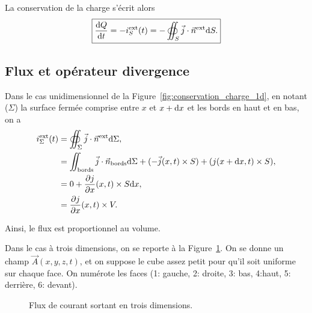         La conservation de la charge s'écrit alors
        \begin{equation}
            \boxed{
                \frac{\mathrm{d} Q}{\mathrm{d} t}=-i_{S}^{\text{ext}}(t)=-\oiint_{S}\vec{j}\cdot\vec{n}^{\text{ext}}\mathrm{d} S.
            }
        \end{equation}

    \subsection{Flux et opérateur \og divergence\fg}

        Dans le cas unidimensionnel de la Figure~\ref{fig:conservation_charge_1d}, en notant ($\Sigma$) la surface fermée comprise entre $x$ et $x+\mathrm{d} x$ et les bords en haut et en bas, on a 
        \begin{align}
            i_{\Sigma}^{\text{ext}}(t)
            &=
            \oiint_{\Sigma}\vec{j}\cdot\vec{n}^{\text{ext}}\mathrm{d}\Sigma,\\
            &=
            \iint_{\text{bords}}\vec{j}\cdot\vec{n}_{\text{bords}}\mathrm{d}\Sigma+(-\vec{j}(x,t)\times S)+(j(x+\mathrm{d} x,t)\times S),\\
            &= 0 +\frac{\partial j}{\partial x}(x,t)\times S\mathrm{d} x,\\
            &=\frac{\partial j}{\partial x}(x,t) \times V.
        \end{align}

        Ainsi, le flux est proportionnel au volume.

        Dans le cas à trois dimensions, on se reporte à la Figure~\ref{fig:flux_operateur_divergence_trois_dimensions}. On se donne un champ $\vec{A}(x,y,z,t)$, et on suppose le cube assez petit pour qu'il soit uniforme sur chaque face. On numérote les faces (1: gauche, 2: droite, 3: bas, 4:haut, 5: derrière, 6: devant).

        \begin{figure}
            \centering
            \caption{Flux de courant sortant en trois dimensions.}    
            \label{fig:flux_operateur_divergence_trois_dimensions}
        \end{figure}

